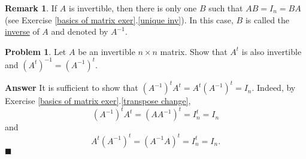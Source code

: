 \documentclass[12pt,letterpaper]{book}
\numberwithin{equation}{section}
\theoremstyle{definition}
\newtheorem{problem}[thm]{\textbf{Problem}}
\newtheorem{remark}[thm]{\textbf{Remark}}
\newenvironment{answer}{\noindent\textbf{Answer}}{\hfill$\blacksquare$\vspace{0.1in}}
\begin{document}
\begin{remark}
If $A$ is invertible, then there is only one $B$ such that $AB=I_n=BA$ (see Exercise \ref{basics of matrix exer}.\ref{unique inv}). In this case, $B$ is called the \underline{inverse} of $A$ and denoted by $A^{-1}$.
\end{remark}

\begin{problem}\label{inverse transpose}
Let $A$ be an invertible $n\times n$ matrix. Show that $A^t$ is also invertible and $(A^t)^{-1}=(A^{-1})^t$.
\end{problem}

\begin{answer}
It is sufficient to show that $(A^{-1})^tA^t=A^t(A^{-1})^t=I_n$. Indeed, by Exercise \ref{basics of matrix exer}.\ref{transpose change},
$$(A^{-1})^tA^t=(AA^{-1})^t=I_n^t=I_n$$
and
$$A^t(A^{-1})^t=(A^{-1}A)^t=I_n^t=I_n.$$
\end{answer}
\end{document}
